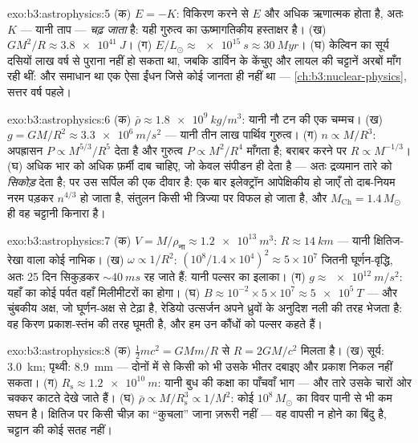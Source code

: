 \begin{solution}{exo:b3:astrophysics:5}
(क) $E = -K$: विकिरण करने से $E$ और अधिक ऋणात्मक होता है, अतः $K$ ---
यानी ताप --- \emph{चढ़ जाता} है: यही गुरुत्व का ऊष्मागतिकीय
हस्ताक्षर है। (ख) $GM^2/R \approx \qty{3.8e41}{J}$। (ग)
$E/L_\odot \approx \qty{e15}{s} \approx \qty{30}{Myr}$। (घ)
केल्विन का सूर्य दसियों लाख वर्ष से पुराना नहीं हो सकता था, जबकि
डार्विन के केंचुए और लायल की चट्टानें अरबों माँग रही थीं: और
समाधान था एक ऐसा ईंधन जिसे कोई जानता ही नहीं था ---
\cref{ch:b3:nuclear-physics}, सत्तर वर्ष पहले।
\end{solution}

\begin{solution}{exo:b3:astrophysics:6}
(क) $\bar\rho \approx \qty{1.8e9}{kg/m^3}$: यानी नौ टन की एक
चम्मच। (ख) $g = GM/R^2 \approx \qty{3.3e6}{m/s^2}$ --- यानी तीन
लाख पार्थिव गुरुत्व। (ग) $n \propto M/R^3$:
अपह्रासन $P \propto M^{5/3}/R^5$ देता है और गुरुत्व
$P \propto M^2/R^4$ माँगता है; बराबर करने पर $R \propto M^{-1/3}$। (घ) अधिक
भार को अधिक फ़र्मी दाब चाहिए, जो केवल संपीडन ही देता है
--- अतः द्रव्यमान तारे को \emph{सिकोड़} देता है; पर उस सर्पिल की एक
दीवार है: एक बार इलेक्ट्रॉन आपेक्षिकीय हो जाएँ तो दाब-नियम नरम पड़कर
$n^{4/3}$ हो जाता है, संतुलन किसी भी त्रिज्या पर विफल हो जाता है, और
$M_{\text{Ch}} = 1.4\,M_\odot$ ही वह चट्टानी किनारा है।
\end{solution}

\begin{solution}{exo:b3:astrophysics:7}
(क) $V = M/\rho_{\text{ना}} \approx \qty{1.2e13}{m^3}$:
$R \approx \qty{14}{km}$ --- यानी क्षितिज-रेखा वाला कोई नाभिक। (ख)
$\omega \propto 1/R^2$: $(10^8/1.4\times10^4)^2
\approx 5\times10^{7}$ जितनी घूर्णन-वृद्धि, अतः 25 दिन सिकुड़कर
${\sim}\qty{40}{ms}$ रह जाते हैं: यानी पल्सर का इलाका। (ग) $g \approx
\qty{e12}{m/s^2}$: यहाँ का कोई पर्वत वहाँ मिलीमीटरों का होगा।
(घ) $B \approx 10^{-2}\times5\times10^{7} \approx
\qty{5e5}{T}$ --- और चुंबकीय अक्ष, जो घूर्णन-अक्ष से टेढ़ा है,
रेडियो उत्सर्जन अपने ध्रुवों के अनुदिश नली की तरह भेजता है: वह किरण
प्रकाश-स्तंभ की तरह घूमती है, और हम उन कौंधों को पल्सर कहते हैं।
\end{solution}

\begin{solution}{exo:b3:astrophysics:8}
(क) $\tfrac12mc^2 = GMm/R$ से $R = 2GM/c^2$ मिलता है। (ख) सूर्य:
\qty{3.0}{km}; पृथ्वी: \qty{8.9}{mm} --- दोनों में से किसी को भी
उसके भीतर दबाइए और प्रकाश निकल नहीं सकता। (ग) $R_{\text{s}} \approx
\qty{1.2e10}{m}$: यानी बुध की कक्षा का पाँचवाँ भाग --- और तारे
उसके चारों ओर चक्कर काटते देखे जाते हैं। (घ) $\bar\rho \propto
M/R_{\text{s}}^3 \propto 1/M^2$: कोई $10^8\,M_\odot$ का विवर पानी से
भी कम सघन है। क्षितिज पर किसी चीज़ का ``कुचला'' जाना ज़रूरी नहीं ---
वह वापसी न होने का बिंदु है, चट्टान की कोई सतह नहीं।
\end{solution}

